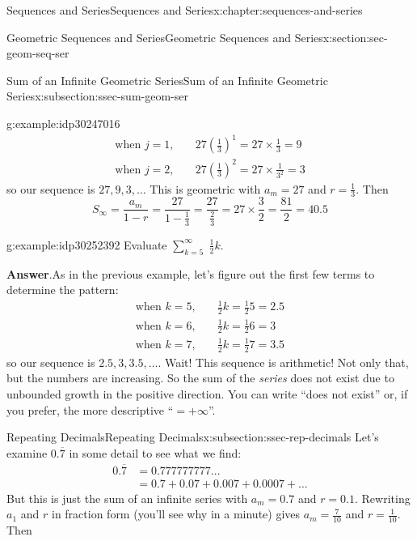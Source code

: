 \documentclass[twoside,10pt,]{book}
\newcommand{\blocktitlefont}{\relax}
\numberwithin{equation}{section}
\newcommand{\amp}{&}
\begin{document}
\begin{chapterptx}{Sequences and Series}{}{Sequences and Series}{}{}{x:chapter:sequences-and-series}
\begin{sectionptx}{Geometric Sequences and Series}{}{Geometric Sequences and Series}{}{}{x:section:sec-geom-seq-ser}
\begin{subsectionptx}{Sum of an Infinite Geometric Series}{}{Sum of an Infinite Geometric Series}{}{}{x:subsection:ssec-sum-geom-ser}
\begin{example}{}{g:example:idp30247016}
\begin{align*}
\text{when } j = 1,\quad \amp 27{\left( {\frac{1}{3}} \right)^1} = 27 \times \frac{1}{3} = 9\\
\text{when } j = 2,\quad \amp 27{\left( {\frac{1}{3}} \right)^2} = 27 \times \frac{1}{{{3^2}}} = 3
\end{align*}
so our sequence is \(27, 9, 3, \ldots\)  This is geometric with \(a_m = 27\) and \(r = \frac{1}{3}\).  Then%
\begin{equation*}
{S_\infty } = \frac{{{a_m}}}{{1 - r}}
= \frac{{27}}{{1 - \frac{1}{3}}}
= \frac{{27}}{{\frac{2}{3}}}
= 27 \times \frac{3}{2}
= \frac{{81}}{2}
= 40.5
\end{equation*}
\end{example}
 \begin{example}{}{g:example:idp30252392}%
Evaluate \(\sum\limits_{k = 5}^\infty  {\;\frac{1}{2}} k\).\par\smallskip%
\noindent\textbf{\blocktitlefont Answer}.\label{g:answer:idp30258152}{}\hypertarget{g:answer:idp30258152}{}\quad{}As in the previous example, let's figure out the first few terms to determine the pattern:%
\begin{align*}
\text{when } k = 5,\quad \amp \frac{1}{2}k = \frac{1}{2}5 = 2.5\\
\text{when } k = 6,\quad \amp \frac{1}{2}k = \frac{1}{2}6 = 3\\
\text{when } k = 7,\quad \amp \frac{1}{2}k = \frac{1}{2}7 = 3.5
\end{align*}
so our sequence is \(2.5, 3, 3.5, \ldots\).  Wait!  This sequence is arithmetic!  Not only that, but the numbers are increasing.  So the sum of the \emph{series} does not exist due to unbounded growth in the positive direction. You can write ``does not exist'' or, if you prefer, the more descriptive ``\(=+\infty\)''.\end{example}
%
\end{subsectionptx}
%
%
\typeout{************************************************}
\typeout{************************************************}
%
\begin{subsectionptx}{Repeating Decimals}{}{Repeating Decimals}{}{}{x:subsection:ssec-rep-decimals}
Let's examine \(0.\overline 7\) in some detail to see what we find:%
\begin{align*}
0.\overline 7 \amp = 0.777777777...\\
\amp = 0.7 + 0.07 + 0.007 + 0.0007 + \ldots
\end{align*}
But this is just the sum of an infinite series with \(a_m = 0.7\) and \(r = 0.1\).  Rewriting \(a_1\) and \(r\) in fraction form (you'll see why in a minute) gives \(a_m = \frac{7}{10}\) and \(r =\frac{1}{10}\).  Then%

\end{subsectionptx}
\end{sectionptx}
\end{chapterptx}
\end{document}

